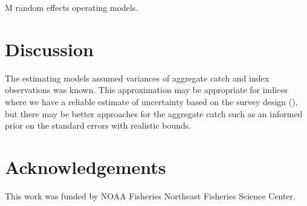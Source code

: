 \documentclass[
  12pt,
]{article}
\newlength{\cslhangindent}
\newlength{\cslentryspacingunit} %
\newenvironment{CSLReferences}[2] %
 {%
  \setlength{\parindent}{0pt}
  \ifodd #1
  \let\oldpar\par
  \def\par{\hangindent=\cslhangindent\oldpar}
  \fi
  \setlength{\parskip}{#2\cslentryspacingunit}
 }%
 {}
\begin{document}
\begin{table}
\caption{M random effects operating models.}
{}
\end{table}
\clearpage

\hypertarget{discussion}{%
\section{Discussion}\label{discussion}}

The estimating models assumed variances of aggregate catch and index
observations was known. This approximation may be appropriate for
indices where we have a reliable estimate of uncertainty based on the
survey design (), but there may be better approaches for the aggregate
catch such as an informed prior on the standard errors with realistic
bounds.

\hypertarget{acknowledgements}{%
\section*{Acknowledgements}\label{acknowledgements}}

This work was funded by NOAA Fisheries Northeast Fisheries Science
Center.

\pagebreak



\hypertarget{refs}{}
\begin{CSLReferences}{0}{0}
\end{CSLReferences}

\pagebreak

\clearpage
\end{document}

